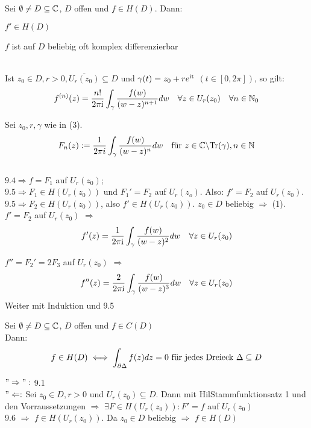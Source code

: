 \documentclass[a4paper,twoside,DIV15,BCOR12mm]{scrbook}
\def\gdw{\equizu}
\def\Tr{\text{Tr}}
\def\gdw{\equizu}
\def\ie{\rm i}
\begin{document}
\begin{satz}
Sei $\emptyset \neq D \subseteq \mathbb{C}$, $D$ offen und $f \in H(D)$. Dann:
\begin{liste}
\item $f' \in H(D)$
\item $f$ ist auf $D$ beliebig oft komplex differenzierbar
\item {} \\
      Ist $z_0 \in D, r>0, \overline{U_r(z_0)} \subseteq D$ und $\gamma(t) = z_0+ r e^{\ie t}$
       $(t \in [0, 2\pi])$, so gilt: \\
       \[f^{(n)}(z) = \frac{n!}{2\pi \ie} \int_{\gamma}
       \frac{f(w)}{(w-z)^{n+1}} dw \quad \forall z \in U_r(z_0) \quad \forall n
       \in \MdN_0 \] 
      
\end{liste}

\end{satz}
\begin{beweis}
Sei $z_0, r, \gamma$ wie in (3). \\
\[ F_n(z) :=\frac{1}{2\pi i} \int_{\gamma} \frac{f(w)}{(w-z)^n} dw \quad \text{für } z\in \MdC
\backslash \Tr(\gamma), n \in \MdN\] \\
$9.4 \Rightarrow f = F_1$ auf $U_r(z_0)$; \\
$9.5 \Rightarrow F_1 \in H(U_r(z_0))$ und $F_1'=F_2$ auf $U_r(z_o)$. Also: $f'=F_2$ auf $U_r(z_0)$. $9.5 \Rightarrow F_2\in H(U_r(z_0))$, also $f' \in H(U_r(z_0))$. $z_0\in D$
beliebig $\Rightarrow$ (1). \\
$f' = F_2$ auf $U_r(z_0)$ $\Rightarrow$ 
\[
	f'(z) = \frac{1}{2\pi\ie}\int_{\gamma} \frac{f(w)}{(w-z)^2} dw \quad \forall z
	\in U_r(z_0)
 \]

$f'' = F_2' = 2F_3$ auf $U_r(z_0)$ $\Rightarrow$  \\
\[
	f''(z) = \frac{2}{2\pi\ie}\int_{\gamma} \frac{f(w)}{(w-z)^3} dw \quad \forall z
	\in U_r(z_0)
\]
Weiter mit Induktion und 9.5
\end{beweis}
\begin{satz}
Sei $\emptyset \neq D \subseteq \mathbb{C}$, $D$ offen und $f \in C(D)$\\
Dann: \[f\in H(D) \gdw \int_{\partial \Delta} f(z) dz = 0 \text{ für jedes
Dreieck } \Delta \subseteq D\]
\end{satz}
\begin{beweis}
$"\Rightarrow":$ 9.1 \\
$"\Leftarrow:$ Sei $z_0 \in D, r > 0$ und $U_r(z_0) \subseteq D$. Dann mit
HilStammfunktionsatz 1 und den Vorraussetzungen $\Rightarrow$ $\exists F \in H(U_r(z_0)):
F' = f$ auf $U_r(z_0)$ \\ 
9.6 $\Rightarrow$ $f \in H(U_r(z_0))$. Da $z_0 \in D$ beliebig $\Rightarrow$ $f
\in H(D)$
\end{beweis}
\end{document}
